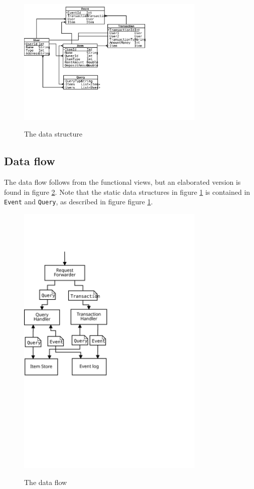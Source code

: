 \begin{figure}[h!]
  \centering
  \caption{The data structure}
  \includegraphics[width=0.8\textwidth]{figures/data_structure}
  \label{fig:data_struct}
\end{figure}


\subsection{Data flow}
\label{sec:data-flow}
The data flow follows from the functional views, but an elaborated version is found in figure \ref{fig:data_flow}. Note that the static data structures in figure \ref{fig:data_struct} is contained in \texttt{Event} and \texttt{Query}, as described in figure figure \ref{fig:data_struct}.

\begin{figure}[h!]
  \centering
  \caption{The data flow}
  \includegraphics[width=0.8\textwidth]{figures/data_flow}
  \label{fig:data_flow}
\end{figure}

